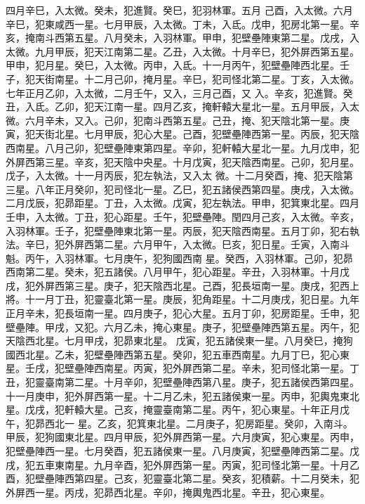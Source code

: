 \begin{pinyinscope}
 四月辛巳，入太微。癸未，犯進賢。癸巳，犯羽林軍。五月
 己酉，入太微。六月辛巳，犯東咸西一星。七月甲辰，入太微。丁未，入氐。戊申，犯房北第一星。辛亥，掩南斗西第五星。八月癸未，入羽林軍。甲申，犯壁壘陣東第二星。戊戌，入太微。九月甲辰，犯天江南第二星。乙丑，入太微。十月辛巳，犯外屏西第五星。甲申，犯月星。癸巳，入太微。丙申，入氐。十一月丙午，犯壁壘陣西北星。壬子，犯天街南星。十二月己卯，掩月星。辛巳，犯司怪北第二星。丁亥，入太微。七年正月乙卯，入太微，二月壬午，又入，三月己酉，又
 入。辛亥，犯進賢。癸丑，入氐。乙卯，犯天江南一星。四月乙亥，掩軒轅大星北一星。五月甲辰，入太微。六月辛未，又入。己卯，犯南斗西第五星。己丑，掩、犯天陰北第一星。庚寅，犯天街北星。七月甲辰，犯心大星。己酉，犯壁壘陣西第一星。丙辰，犯天陰西南星。八月己卯，犯壁壘陣東第四星。辛卯，犯軒轅大星北一星。九月戊申，犯外屏西第三星。辛亥，犯天陰中央星。十月戊寅，犯天陰西南星。己卯，犯月星。戊子，入太微。十一月丙辰，犯左執法，又入太
 微。十二月癸酉，掩、犯天陰第三星。八年正月癸卯，犯司怪北一星。乙巳，犯五諸侯西第四星。庚戌，入太微。二月戊辰，犯昴距星。丁丑，入太微。戊寅，犯左執法。甲申，犯箕東北星。四月壬申，入太微。丁丑，犯心距星。壬午，犯壁壘陣。閏四月己亥，入太微。辛亥，入羽林軍。壬子，犯壁壘陣東北第一星。丙辰，犯天陰西南星。五月丁卯，犯右執法。辛巳，犯外屏西第二星。六月甲午，入太微。巳亥，犯日星。壬寅，入南斗魁。丙午，入羽林軍。七月庚午，犯狗國西南
 星。癸西，入羽林軍。己卯，犯昴西南第二星。癸未，犯五諸侯。八月甲午，犯心距星。辛丑，入羽林軍。十月戊戌，犯外屏西第三星。庚子，犯天陰西北星。己酉，犯長垣南一星。庚戌，犯西上將。十一月丁丑，犯靈臺北第一星。庚辰，犯角距星。十二月庚戌，犯日星。九年正月辛未，犯長垣南一星。四月庚子，犯心大星。五月丁卯，犯房距星。壬申，犯壁壘陣。甲戌，又犯。六月乙未，掩心東星。庚子，犯壁壘陣西第五星。丙午，犯天陰西北星。七月甲戌，犯昴東北星。
 戊寅，犯五諸侯東一星。八月癸巳，掩狗國西北星。乙未，犯壁壘陣西第五星。癸卯，犯五車西南星。九月丁巳，犯心東星。壬戌，犯壁壘陣西南星。丙寅，犯外屏西第二星。辛未，犯司怪北第一星。丁丑，犯靈臺南第二星。十月辛卯，犯壁壘陣西第八星。庚子，犯五諸侯西第四星。十一月庚申，犯外屏西第一星。十二月乙未，犯五諸侯東一星。丙申，犯輿鬼東北星。戊戌，犯軒轅大星。己亥，掩靈臺南第二星。丙午，犯心東星。十年正月戊午，犯昴西北一
 星。乙亥，犯箕東北星。二月庚子，犯房距星。癸卯，入南斗。甲辰，犯狗國東北星。四月甲辰，犯外屏西第一星。六月庚寅，犯心東星。丙申，犯壁壘陣西一星。七月癸酉，犯五諸侯東一星。八月庚寅，犯壁壘陣西第二星。戊戌，犯五車東南星。九月辛酉，犯外屏西第一星。丙寅，犯司怪北第一星。十月乙酉，犯壁壘陣西第四星。己亥，犯靈臺北第二星。癸亥，犯積薪。十二月癸未，犯外屏西一星。丙戌，犯昴西北星。辛卯，掩輿鬼西北星。辛丑，犯心東星。




\end{pinyinscope}
